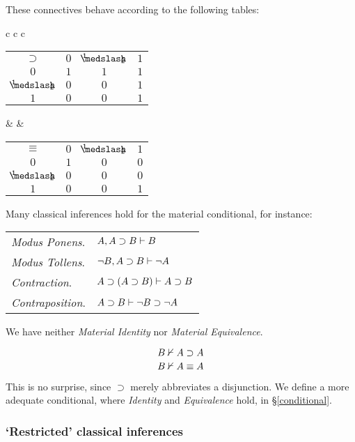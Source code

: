 \noindent These connectives behave according to the following tables:
\begin{singlespace}
\begin{longtable}{c c c}
\begin{tabular}{c | c c c}
$\supset$ & $0$ & $\oneHalf$ & $1$ \\
\cline{1-4} 
$0$ & $1$ & $1$ & $1$ \\
$\oneHalf$ & $0$ & $0$ & $1$ \\
$1$ & $0$ & $0$ & $1$ \\
\end{tabular}
 & & 
\begin{tabular}{c | c c c}
$\equiv$ & $0$ & $\oneHalf$ & $1$ \\
\cline{1-4} 
$0$ & $1$ & $0$ & $0$ \\
$\oneHalf$ & $0$ & $0$ & $0$ \\
$1$ & $0$ & $0$ & $1$ \\
\end{tabular}
\end{longtable}
\end{singlespace}
\noindent Many classical inferences hold for the material conditional, for instance:

\bigskip

\begin{tabular}{l l}
 \emph{Modus Ponens}.  & 	${A, A\supset B}\vdash{B}$ \\
 \emph{Modus Tollens}. & 	${\neg B, A \supset B}\vdash{\neg A} $ \\
 \emph{Contraction}.		& 	${A\supset(A\supset B)}\vdash{A\supset B}$ \\
 \emph{Contraposition}.& 	${A\supset B}\vdash{\neg B\supset\neg A}$
\end{tabular}

\bigskip

\noindent We have neither \emph{Material Identity} nor \emph{Material Equivalence}.

\[ {B}\nvdash{A\supset A} \]
\[ {B}\nvdash{A\equiv A} \]

\noindent This is no surprise, since $\supset$ merely abbreviates a disjunction. We define a more adequate conditional, where \emph{Identity} and \emph{Equivalence} hold, in \S\ref{conditional}.

\subsubsection{`Restricted' classical inferences}\label{restrictedInferences}

